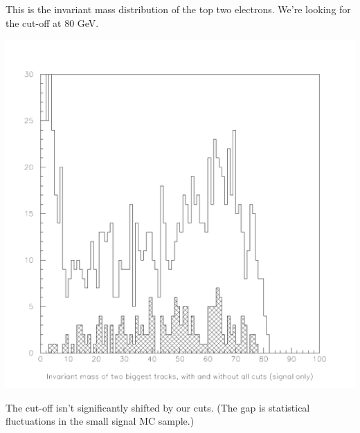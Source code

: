 \documentclass[landscape]{article}
\begin{document}
This is the invariant mass distribution of the top two electrons.
We're looking for the cut-off at 80 GeV.

\pagebreak

\begin{center} \includegraphics[height=0.8\textheight]{withmatching_7.pdf} \end{center}

The cut-off isn't significantly shifted by our cuts.  (The gap is
statistical fluctuations in the small signal MC sample.)
\end{document}
